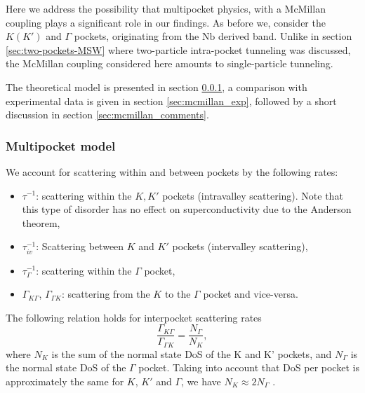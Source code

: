 \documentclass[showpacs,superscriptaddress,onecolumn,prb]{revtex4}
\begin{document}
Here we address the possibility that multipocket physics, with a McMillan coupling\cite{mcmillan} plays a significant role in our findings.
As before we, consider the $K(K')$ and $\Gamma$ pockets, originating from the $\mathrm{Nb}$ derived band\cite{Wickramaratne2020}.
Unlike in section \ref{sec:two-pockets-MSW} where two-particle intra-pocket tunneling was discussed, the McMillan coupling considered here amounts to single-particle tunneling.

The theoretical model is presented in section \ref{sec:mcmillan_model},  a comparison with experimental data is given in section \ref{sec:mcmillan_exp}, followed by a short discussion in section \ref{sec:mcmillan_comments}.

\subsubsection{Multipocket model}\label{sec:mcmillan_model}

We account for scattering within and between pockets by the following rates:
\begin{itemize}
	\item $\tau^{-1}$: scattering within the $K,K'$ pockets (intravalley scattering). Note that this type of disorder has no effect on superconductivity due to the Anderson theorem,
	\item $\tau_{iv}^{-1}$: Scattering between $K$ and $K'$ pockets (intervalley scattering),
	\item $\tau_\Gamma^{-1}$: scattering within the $\Gamma$ pocket, 
	\item $\Gamma_{K\Gamma}$, $\Gamma_{\Gamma K}$: scattering from the $K$ to the $\Gamma$ pocket and vice-versa. 
\end{itemize}
The following relation holds for interpocket scattering rates
\begin{equation}
\frac{\Gamma_{K\Gamma}}{\Gamma_{\Gamma K}}=\frac{N_\Gamma}{N_K},
\label{eq2}
\end{equation}
where $N_K$ is the sum of the normal state DoS of the K and K' pockets, and $N_\Gamma$ is the normal state DoS of the $\Gamma$ pocket. Taking into account that DoS per pocket is approximately the same for $K$, $K'$ and $\Gamma$, we have $N_K\approx 2 N_\Gamma$ \cite{sticlet2019topological}. 
\end{document}
